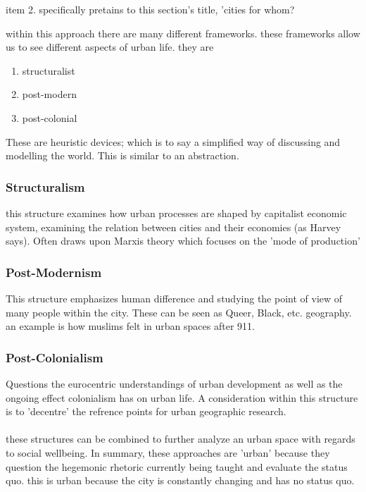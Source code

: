 \documentclass[12pt]{book}
\begin{document}
item 2. specifically pretains to this section's title, 'cities for whom?

within this approach there are many different frameworks.
these frameworks allow us to see different aspects of urban life.
they are 
\begin{enumerate}
        \item structuralist
        \item post-modern
        \item post-colonial
\end{enumerate}

These are heuristic devices; which is to say a simplified way of discussing and modelling the world.
This is similar to an abstraction.

\subsubsection{Structuralism}
this structure examines how urban processes are shaped by capitalist economic system, examining 
        the relation between cities and their economies (as Harvey says).
Often draws upon Marxis theory which focuses on the 'mode of production'

\subsubsection{Post-Modernism}
This structure emphasizes human difference and studying the point of view of many people within the city.
These can be seen as Queer, Black, etc. geography. an example is how muslims felt in urban spaces after 911.

\subsubsection{Post-Colonialism}
Questions the eurocentric understandings of urban development as well as the ongoing effect colonialism has on urban life.
A consideration within this structure is to 'decentre' the refrence points for urban geographic research.

\paragraph{}
these structures can be combined to further analyze an urban space with regards to social wellbeing.
In summary, these approaches are 'urban' because they question the hegemonic rhetoric currently being taught and 
        evaluate the status quo. this is urban because the city is constantly changing and has no status quo.
\end{document}
